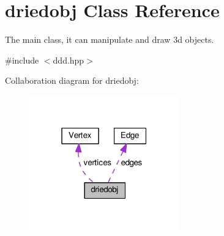 \hypertarget{classdriedobj}{\section{driedobj Class Reference}
\label{classdriedobj}
}


The main class, it can manipulate and draw 3d objects.  




{\ttfamily \#include $<$ddd.\+hpp$>$}



Collaboration diagram for driedobj\+:
\nopagebreak
\begin{figure}[H]
\begin{center}
\leavevmode
\includegraphics[width=183pt]{classdriedobj__coll__graph}
\end{center}
\end{figure}

